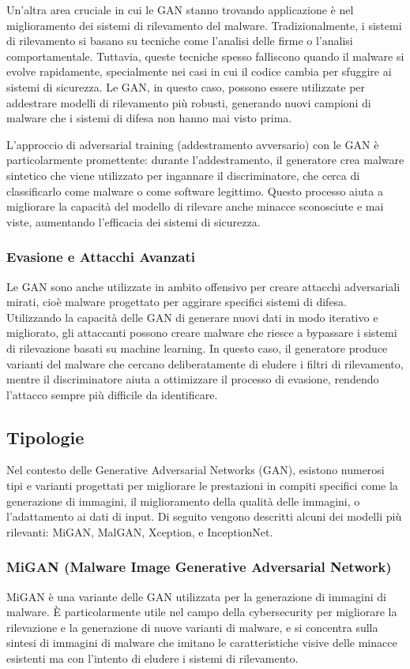 Un'altra area cruciale in cui le GAN stanno trovando applicazione è nel miglioramento dei sistemi di rilevamento del malware. Tradizionalmente, i sistemi di rilevamento si basano su tecniche come l'analisi delle firme o l'analisi comportamentale. Tuttavia, queste tecniche spesso falliscono quando il malware si evolve rapidamente, specialmente nei casi in cui il codice cambia per sfuggire ai sistemi di sicurezza. Le GAN, in questo caso, possono essere utilizzate per addestrare modelli di rilevamento più robusti, generando nuovi campioni di malware che i sistemi di difesa non hanno mai visto prima.

L'approccio di adversarial training (addestramento avversario) con le GAN è particolarmente promettente: durante l'addestramento, il generatore crea malware sintetico che viene utilizzato per ingannare il discriminatore, che cerca di classificarlo come malware o come software legittimo. Questo processo aiuta a migliorare la capacità del modello di rilevare anche minacce sconosciute e mai viste, aumentando l'efficacia dei sistemi di sicurezza.

\subsubsection{Evasione e Attacchi Avanzati}
Le GAN sono anche utilizzate in ambito offensivo per creare attacchi adversariali mirati, cioè malware progettato per aggirare specifici sistemi di difesa. Utilizzando la capacità delle GAN di generare nuovi dati in modo iterativo e migliorato, gli attaccanti possono creare malware che riesce a bypassare i sistemi di rilevazione basati su machine learning. In questo caso, il generatore produce varianti del malware che cercano deliberatamente di eludere i filtri di rilevamento, mentre il discriminatore aiuta a ottimizzare il processo di evasione, rendendo l'attacco sempre più difficile da identificare.

\subsection{Tipologie}
Nel contesto delle Generative Adversarial Networks (GAN), esistono numerosi tipi e varianti progettati per migliorare le prestazioni in compiti specifici come la generazione di immagini, il miglioramento della qualità delle immagini, o l'adattamento ai dati di input. Di seguito vengono descritti alcuni dei modelli più rilevanti: MiGAN, MalGAN, Xception, e InceptionNet.

\subsubsection{MiGAN (Malware Image Generative Adversarial Network)}
MiGAN è una variante delle GAN utilizzata per la generazione di immagini di malware. È particolarmente utile nel campo della cybersecurity per migliorare la rilevazione e la generazione di nuove varianti di malware, e si concentra sulla sintesi di immagini di malware che imitano le caratteristiche visive delle minacce esistenti ma con l'intento di eludere i sistemi di rilevamento.

